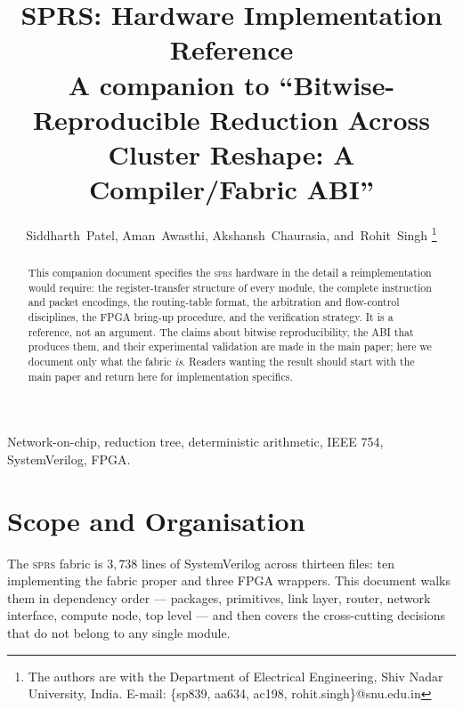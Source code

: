 \documentclass[journal,10pt]{IEEEtran}
\newcommand{\sprs}{\textsc{sprs}}
\begin{document}
\title{SPRS: Hardware Implementation Reference\\
{\large A companion to ``Bitwise-Reproducible Reduction Across Cluster
Reshape: A Compiler/Fabric ABI''}}

\author{%
Siddharth~Patel,
Aman~Awasthi,
Akshansh~Chaurasia,
and~Rohit~Singh%
\thanks{The authors are with the Department of Electrical Engineering,
Shiv Nadar University, India.
E-mail: \{sp839, aa634, ac198, rohit.singh\}@snu.edu.in}%
}

\maketitle

\begin{abstract}
This companion document specifies the \sprs{} hardware in the detail a
reimplementation would require: the register-transfer structure of every
module, the complete instruction and packet encodings, the routing-table
format, the arbitration and flow-control disciplines, the FPGA bring-up
procedure, and the verification strategy. It is a reference, not an argument.
The claims about bitwise reproducibility, the ABI that produces them, and
their experimental validation are made in the main paper; here we document
only what the fabric \emph{is}. Readers wanting the result should start with
the main paper and return here for implementation specifics.
\end{abstract}

\begin{IEEEkeywords}
Network-on-chip, reduction tree, deterministic arithmetic, IEEE 754,
SystemVerilog, FPGA.
\end{IEEEkeywords}

\section{Scope and Organisation}

The \sprs{} fabric is $3{,}738$ lines of SystemVerilog across thirteen
files: ten implementing the fabric proper and three FPGA wrappers. This
document walks them in dependency order --- packages, primitives, link layer,
router, network interface, compute node, top level --- and then covers the
cross-cutting decisions that do not belong to any single module.
\end{document}
